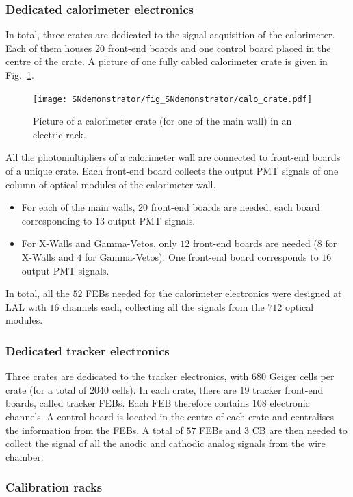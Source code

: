 \subsubsection*{Dedicated calorimeter electronics}

In total, three crates are dedicated to the signal acquisition of the calorimeter.
Each of them houses $20$ front-end boards and one control board placed in the centre of the crate.
A picture of one fully cabled calorimeter crate is given in Fig.~\ref{fig:calo_crate}.
\begin{figure}[h]
  \centering
  \texttt{[image: SNdemonstrator/fig\_SNdemonstrator/calo\_crate.pdf]}
  \caption{Picture of a calorimeter crate (for one of the main wall) in an electric rack.
    \label{fig:calo_crate}}
\end{figure}
All the photomultipliers of a calorimeter wall are connected to front-end boards of a unique crate.
Each front-end board collects the output PMT signals of one column of optical modules of the calorimeter wall.
\begin{itemize}
\item For each of the main walls, $20$ front-end boards are needed, each board corresponding to $13$ output PMT signals.
\item For X-Walls and Gamma-Vetos, only $12$ front-end boards are needed ($8$ for X-Walls and $4$ for Gamma-Vetos).
  One front-end board corresponds to $16$ output PMT signals.
\end{itemize}
In total, all the $52$ FEBs needed for the calorimeter electronics were designed at LAL with $16$ channels each, collecting all the signals from the $712$ optical modules.

\subsubsection*{Dedicated tracker electronics}


Three crates are dedicated to the tracker electronics, with $680$ Geiger cells per crate (for a total of $2040$ cells).
In each crate, there are $19$ tracker front-end boards, called tracker FEBs.
Each FEB therefore contains $108$ electronic channels.
A control board is located in the centre of each crate and centralises the information from the FEBs.
A total of $57$ FEBs and $3$ CB are then needed to collect the signal of all the anodic and cathodic analog signals from the wire chamber.

\subsubsection*{Calibration racks}

